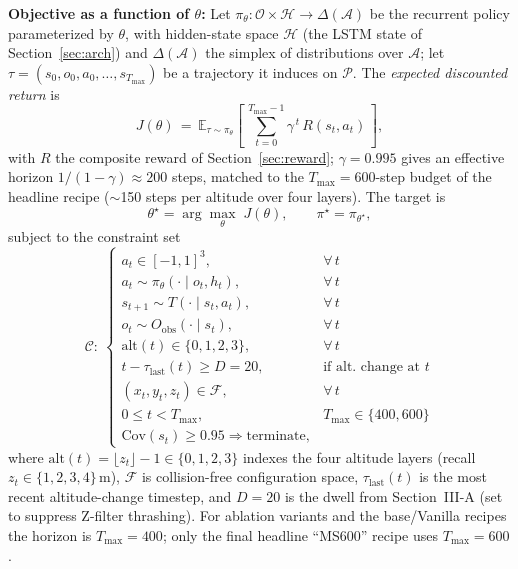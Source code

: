 \documentclass[conference]{IEEEtran}
\begin{document}
\noindent\textbf{Objective as a function of $\theta$:} Let $\pi_\theta\!:\!\mathcal{O}\!\times\!\mathcal{H}\!\to\!\Delta(\mathcal{A})$ be the recurrent policy parameterized by $\theta$, with hidden-state space $\mathcal{H}$ (the LSTM state of Section~\ref{sec:arch}) and $\Delta(\mathcal{A})$ the simplex of distributions over $\mathcal{A}$; let $\tau\!=\!(s_0,o_0,a_0,\ldots,s_{T_{\max}})$ be a trajectory it induces on $\mathcal{P}$. The \emph{expected discounted return} is
\begin{equation}
J(\theta) \,=\, \mathbb{E}_{\tau\sim\pi_\theta}\!\left[\,\sum_{t=0}^{T_{\max}-1}\gamma^{\,t}\, R(s_t,a_t)\,\right],
\label{eq:J}
\end{equation}
with $R$ the composite reward of Section~\ref{sec:reward}; $\gamma\!=\!0.995$ gives an effective horizon $1/(1-\gamma)\!\approx\!200$ steps, matched to the $T_{\max}\!=\!600$-step budget of the headline recipe ($\sim$150 steps per altitude over four layers). The target is
\begin{equation}
\theta^{\star} = \arg\max_{\theta}\; J(\theta),\qquad \pi^{\star} = \pi_{\theta^{\star}},
\label{eq:pi_star}
\end{equation}
subject to the constraint set
{\renewcommand{\arraystretch}{0.88}%
\begin{equation}
\mathcal{C}:\
\begin{cases}
a_t \in [-1,1]^3, & \forall\, t \\
a_t \sim \pi_\theta(\cdot\!\mid\!o_t,h_t), & \forall\, t \\
s_{t+1} \sim T(\cdot\!\mid\!s_t,a_t), & \forall\, t \\
o_t \sim O_{\text{obs}}(\cdot\!\mid\!s_t), & \forall\, t \\
\mathrm{alt}(t) \in \{0,1,2,3\}, & \forall\, t \\
t - \tau_{\text{last}}(t) \geq D = 20, & \text{if alt.\ change at } t \\
(x_t, y_t, z_t) \in \mathcal{F}, & \forall\, t \\
0 \leq t < T_{\max}, & T_{\max}\!\in\!\{400,600\} \\
\mathrm{Cov}(s_t)\!\geq\!0.95 \Rightarrow \text{terminate}, &
\end{cases}
\label{eq:constraints}
\end{equation}}%
where $\mathrm{alt}(t)\!=\!\lfloor z_t\rfloor\!-\!1\!\in\!\{0,1,2,3\}$ indexes the four altitude layers (recall $z_t\!\in\!\{1,2,3,4\}\,\text{m}$), $\mathcal{F}$ is collision-free configuration space, $\tau_{\text{last}}(t)$ is the most recent altitude-change timestep, and $D\!=\!20$ is the dwell from Section~III-A (set to suppress Z-filter thrashing). For ablation variants and the base/Vanilla recipes the horizon is $T_{\max}\!=\!400$; only the final headline ``MS600'' recipe uses $T_{\max}\!=\!600$.
\end{document}
